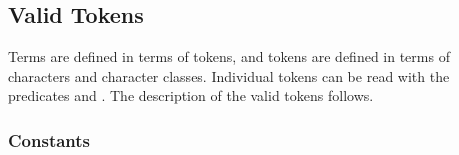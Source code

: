 \subsection{Valid Tokens}
\label{tokendef}

Terms are defined in terms of tokens, and tokens are defined in terms of
characters and character classes.
Individual tokens can be read with the predicates
 and
.
The description of the valid tokens follows.

\vfill %

\subsubsection{Constants}

